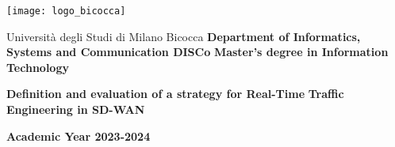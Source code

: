 	\begin{titlepage}
	\begin{flushleft}
		\begin{minipage}[t][6cm][t]{3.5cm}
			\texttt{[image: logo\_bicocca]}
		\end{minipage}
		\begin{minipage}[b][3cm][b]{0.75\textwidth}
			\vspace{0.2cm}
			Università degli Studi di Milano Bicocca
			\vfill
			\textbf {Department of Informatics, Systems and Communication DISCo}
			\vfill
			\textbf{Master's degree in Information Technology}
			\vspace{0.2cm}
		\end{minipage}	
	\end{flushleft}
	
	\vfill
	\begin{center}
		\vspace*{1cm}
		
		\textbf{\Large Definition and evaluation of a strategy for Real-Time}
		\textbf{\Large Traffic Engineering in SD-WAN }
	\end{center}
	
	
	\vspace{4.5cm}
	
	
	\vfill
	

	\begin{center}
	\vspace*{1cm}
	
	\textbf{Academic Year 2023-2024}
	\end{center}
	
	
	
	
\end{titlepage}